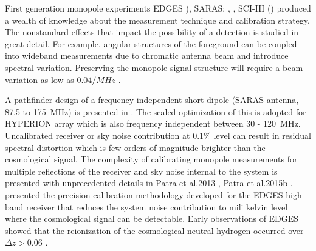 \documentclass[12pt]{amsart}
\begin{document}
First generation monopole experiments EDGES \cite{Bowman_Roger2010}), SARAS; \cite{Patra13}, \cite{Patra15b} , SCI-HI (\cite{Voytek2015}) produced a wealth of knowledge about the measurement technique and calibration strategy. The nonstandard effects that impact the possibility of a detection is studied in great detail. For example, angular structures of the foreground can be coupled into wideband measurements due to chromatic antenna beam and introduce spectral variation. 
Preserving the monopole signal structure will require a beam variation as low as $0.04/ MHz$
 \cite{Mozdzen16}. 

A pathfinder design of a frequency independent short dipole (SARAS antenna,  87.5 to 175~MHz) is presented in \cite{Raghu13}. The scaled optimization of this is adopted for HYPERION array which is also frequency independent between 30 - 120~MHz. Uncalibrated receiver or sky noise contribution at $0.1\%$ level can result in residual spectral distortion which is few orders of magnitude brighter than the cosmological signal. 
The complexity of calibrating monopole measurements for multiple reflections of the receiver and sky noise internal to the system is presented with unprecedented details in \href{http://link.springer.com/article/10.1007\%2Fs10686-013-9336-3}{Patra et al.2013 \cite{Patra13}}, \href{http://www.worldcat.org/title/precision-measurements-of-the-radio-background-at-long-wavelengths-a-thesis-submitted-for-the-degree-of-doctor-of-philosophy/oclc/918897862}{Patra et al.2015b \cite{Patra15b}} .\cite{Monsalve17} presented the precision calibration methodology developed for the EDGES high band receiver that reduces the system noise contribution to mili kelvin level where the cosmological signal can be detectable. Early observations of EDGES showed that the reionization of the cosmological neutral hydrogen occurred over $\Delta z >0.06$ \cite{Bowman_Roger2010}. 
\end{document}
